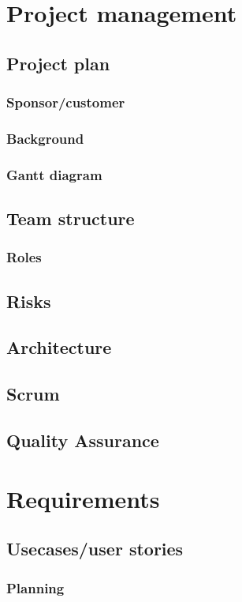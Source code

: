 \documentclass[10pt,a4paper,oneside]{report}
\begin{document}
\chapter{Project management}
\section{Project plan}
\subsection{Sponsor/customer}
\subsection{Background}
\subsection{Gantt diagram}
\section{Team structure}
\subsection{Roles}
\section{Risks}
\section{Architecture}
\section{Scrum}
\section{Quality Assurance}




\clearpage


\chapter{Requirements}
\section{Usecases/user stories}
\subsection{Planning}
\end{document}
